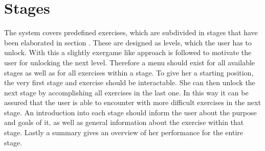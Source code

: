 \section{Stages}\label{4_3_stages}
The system covers predefined exercises, which are subdivided in stages that have been elaborated in section \textit{}. These are designed as levels, which the user has to unlock. With this a slightly exergame like approach is followed to motivate the user for unlocking the next level. Therefore a menu should exist for all available stages as well as for all exercises within a stage. To give her a starting position, the very first stage and exercise should be interactable. She can then unlock the next stage by accomplishing all exercises in the last one. In this way it can be assured that the user is able to encounter with more difficult exercises in the next stage. An introduction into each stage should inform the user about the purpose and goals of it, as well as general information about the exercise within that stage. Lastly a summary gives an overview of her performance for the entire stage.

